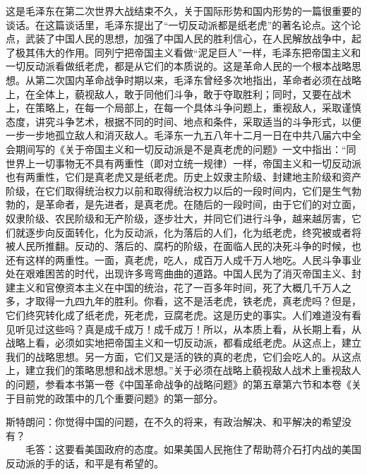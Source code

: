 \documentclass[cn,11pt,chinese]{elegantbook}
\begin{document}
\begin{introduction}\item  这是毛泽东在第二次世界大战结束不久，关于国际形势和国内形势的一篇很重要的谈话。在这篇谈话里，毛泽东提出了“一切反动派都是纸老虎”的著名论点。这个论点，武装了中国人民的思想，加强了中国人民的胜利信心，在人民解放战争中，起了极其伟大的作用。同列宁把帝国主义看做“泥足巨人”一样，毛泽东把帝国主义和一切反动派看做纸老虎，都是从它们的本质说的。这是革命人民的一个根本战略思想。从第二次国内革命战争时期以来，毛泽东曾经多次地指出，革命者必须在战略上，在全体上，藐视敌人，敢于同他们斗争，敢于夺取胜利；同时，又要在战术上，在策略上，在每一个局部上，在每一个具体斗争问题上，重视敌人，采取谨慎态度，讲究斗争艺术，根据不同的时间、地点和条件，采取适当的斗争形式，以便一步一步地孤立敌人和消灭敌人。毛泽东一九五八年十二月一日在中共八届六中全会期间写的《关于帝国主义和一切反动派是不是真老虎的问题》一文中指出：“同世界上一切事物无不具有两重性（即对立统一规律）一样，帝国主义和一切反动派也有两重性，它们是真老虎又是纸老虎。历史上奴隶主阶级、封建地主阶级和资产阶级，在它们取得统治权力以前和取得统治权力以后的一段时间内，它们是生气勃勃的，是革命者，是先进者，是真老虎。在随后的一段时间，由于它们的对立面，奴隶阶级、农民阶级和无产阶级，逐步壮大，并同它们进行斗争，越来越厉害，它们就逐步向反面转化，化为反动派，化为落后的人们，化为纸老虎，终究被或者将被人民所推翻。反动的、落后的、腐朽的阶级，在面临人民的决死斗争的时候，也还有这样的两重性。一面，真老虎，吃人，成百万人成千万人地吃。人民斗争事业处在艰难困苦的时代，出现许多弯弯曲曲的道路。中国人民为了消灭帝国主义、封建主义和官僚资本主义在中国的统治，花了一百多年时间，死了大概几千万人之多，才取得一九四九年的胜利。你看，这不是活老虎，铁老虎，真老虎吗？但是，它们终究转化成了纸老虎，死老虎，豆腐老虎。这是历史的事实。人们难道没有看见听见过这些吗？真是成千成万！成千成万！所以，从本质上看，从长期上看，从战略上看，必须如实地把帝国主义和一切反动派，都看成纸老虎。从这点上，建立我们的战略思想。另一方面，它们又是活的铁的真的老虎，它们会吃人的。从这点上，建立我们的策略思想和战术思想。”关于必须在战略上藐视敌人战术上重视敌人的问题，参看本书第一卷《中国革命战争的战略问题》的第五章第六节和本卷《关于目前党的政策中的几个重要问题》的第一部分。\end{introduction}
斯特朗问：你觉得中国的问题，在不久的将来，有政治解决、和平解决的希望没有？\\
　　毛答：这要看美国政府的态度。如果美国人民拖住了帮助蒋介石打内战的美国反动派的手的话，和平是有希望的。\\
\end{document}

